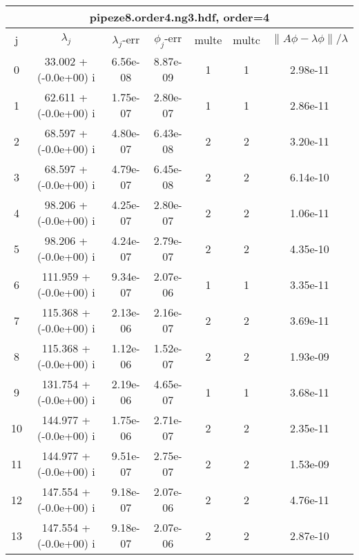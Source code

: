 \begin{table}[H]\tableFont %
\begin{center}
\begin{tabular}{|c|c|c|c|c|c|c|}  \hline
\multicolumn{7}{|c|}{pipeze8.order4.ng3.hdf, order=4} \\ \hline
   j    &         $\lambda_j$        & $\lambda_j$-err  & $\phi_j$-err  & multe & multc & $\| A\phi - \lambda\phi\|/\lambda$     \\ \hline
     0  &     33.002 + (-0.0e+00) i  &    6.56e-08      &   8.87e-09    &   1    &  1   &    2.98e-11 \\
     1  &     62.611 + (-0.0e+00) i  &    1.75e-07      &   2.80e-07    &   1    &  1   &    2.86e-11 \\
     2  &     68.597 + (-0.0e+00) i  &    4.80e-07      &   6.43e-08    &   2    &  2   &    3.20e-11 \\
     3  &     68.597 + (-0.0e+00) i  &    4.79e-07      &   6.45e-08    &   2    &  2   &    6.14e-10 \\
     4  &     98.206 + (-0.0e+00) i  &    4.25e-07      &   2.80e-07    &   2    &  2   &    1.06e-11 \\
     5  &     98.206 + (-0.0e+00) i  &    4.24e-07      &   2.79e-07    &   2    &  2   &    4.35e-10 \\
     6  &    111.959 + (-0.0e+00) i  &    9.34e-07      &   2.07e-06    &   1    &  1   &    3.35e-11 \\
     7  &    115.368 + (-0.0e+00) i  &    2.13e-06      &   2.16e-07    &   2    &  2   &    3.69e-11 \\
     8  &    115.368 + (-0.0e+00) i  &    1.12e-06      &   1.52e-07    &   2    &  2   &    1.93e-09 \\
     9  &    131.754 + (-0.0e+00) i  &    2.19e-06      &   4.65e-07    &   1    &  1   &    3.68e-11 \\
    10  &    144.977 + (-0.0e+00) i  &    1.75e-06      &   2.71e-07    &   2    &  2   &    2.35e-11 \\
    11  &    144.977 + (-0.0e+00) i  &    9.51e-07      &   2.75e-07    &   2    &  2   &    1.53e-09 \\
    12  &    147.554 + (-0.0e+00) i  &    9.18e-07      &   2.07e-06    &   2    &  2   &    4.76e-11 \\
    13  &    147.554 + (-0.0e+00) i  &    9.18e-07      &   2.07e-06    &   2    &  2   &    2.87e-10 \\

\end{tabular}
\end{center}
\end{table}
